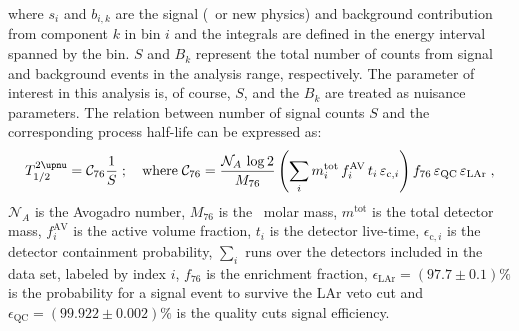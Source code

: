 where $s_i$ and $b_{i,k}$ are the signal (\nnbb\ or new physics) and background
contribution from component $k$ in bin $i$ and the integrals are defined in the energy
interval spanned by the bin. $S$ and $B_k$ represent the total number of counts from
signal and background events in the analysis range, respectively. The parameter of
interest in this analysis is, of course, $S$, and the $B_k$ are treated as nuisance
parameters. The relation between number of signal counts $S$ and the corresponding process
half-life can be expressed as:
\begin{equation}\label{eq:2nbb-ana:halflife}
  \thalftwoM = \mathcal{C}_{76} \frac{1}{S}\;;\quad
    \text{where}\; \mathcal{C}_{76} = \frac{\mathcal{N}_A\, \log2}{M_{76}}
      \left( \sum_i m^\text{tot}_i \, f^\text{AV}_i \, t_i \,
      \epsilon_{\text{c},i} \right) f_{76} \, \epsilon_\text{QC} \, \epsilon_\text{LAr} \;,
\end{equation}
$\mathcal{N}_A$ is the Avogadro number, $M_{76}$ is the \gesix\ molar mass,
$m^\text{tot}$ is the total detector mass, $f^\text{AV}_i$ is the active volume fraction,
$t_i$ is the detector live-time, $\epsilon_{\text{c},i}$ is the detector containment
probability, $\sum_i$ runs over the detectors included in the data set, labeled by index
$i$, $f_{76}$ is the enrichment fraction, $\epsilon_\text{LAr} = (97.7 \pm 0.1)\%$ is
the probability for a signal event to survive the LAr veto cut and $\epsilon_\text{QC} =
(99.922 \pm 0.002)\%$ is the quality cuts signal efficiency.

